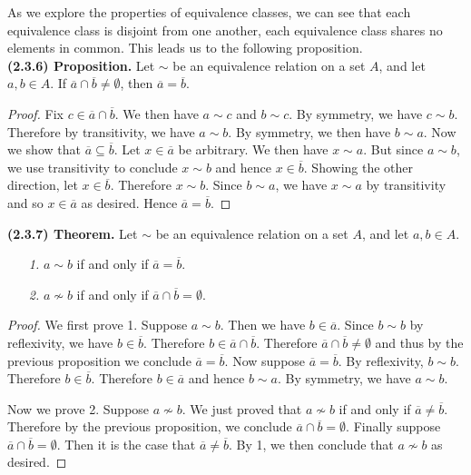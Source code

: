 \documentclass[12pt]{book}
\def\eq[#1]{{\overline{#1}}}
\begin{document}

As we explore the properties of equivalence classes, we can see that each equivalence class is disjoint from one another, each equivalence class shares no elements in common. This leads us to the following proposition.\\

\noindent\textbf{(2.3.6) Proposition.} Let $\sim$ be an equivalence relation on a set $A$, and let $a,b\in A$. If $\eq[a]\cap\eq[b]\neq\emptyset$, then $\eq[a]=\eq[b]$.
\begin{proof}
Fix $c\in\eq[a]\cap\eq[b]$. We then have $a\sim c$ and $b\sim c$. By symmetry, we have $c\sim b$. Therefore by transitivity, we have $a\sim b$. By symmetry, we then have $b\sim a$. Now we show that $\eq[a]\subseteq\eq[b]$. Let $x\in\eq[a]$ be arbitrary. We then have $x\sim a$. But since $a\sim b$, we use transitivity to conclude $x\sim b$ and hence $x\in\eq[b]$. Showing the other direction, let $x\in\eq[b]$. Therefore $x\sim b$. Since $b\sim a$, we have $x\sim a$ by transitivity and so $x\in\eq[a]$ as desired. Hence $\eq[a]=\eq[b]$.  
\end{proof}

\noindent\textbf{(2.3.7) Theorem.} Let $\sim$ be an equivalence relation on a set $A$, and let $a,b\in A$.
\begin{enumerate}
\item[\textit{1.}] $a\sim b$ if and only if $\eq[a]=\eq[b]$.
\item[\textit{2.}] $a\not\sim b$ if and only if $\eq[a]\cap\eq[b]=\emptyset$.
\end{enumerate}

\begin{proof}
We first prove 1. Suppose $a\sim b$. Then we have $b\in\eq[a]$. Since $b\sim b$ by reflexivity, we have $b\in\eq[b]$. Therefore $b\in\eq[a]\cap\eq[b]$. Therefore $\eq[a]\cap\eq[b]\neq\emptyset$ and thus by the previous proposition we conclude $\eq[a]=\eq[b]$. Now suppose $\eq[a]=\eq[b]$. By reflexivity, $b\sim b$. Therefore $b\in\eq[b]$. Therefore $b\in\eq[a]$ and hence $b\sim a$. By symmetry, we have $a\sim b$.

Now we prove 2. Suppose $a\not\sim b$. We just proved that $a\not\sim b$ if and only if $\eq[a]\neq\eq[b]$. Therefore by the previous proposition, we conclude $\eq[a]\cap\eq[b]=\emptyset$. Finally suppose $\eq[a]\cap\eq[b]=\emptyset$. Then it is the case that $\eq[a]\neq\eq[b]$. By 1, we then conclude that $a\not\sim b$ as desired.
\end{proof}
\end{document}
